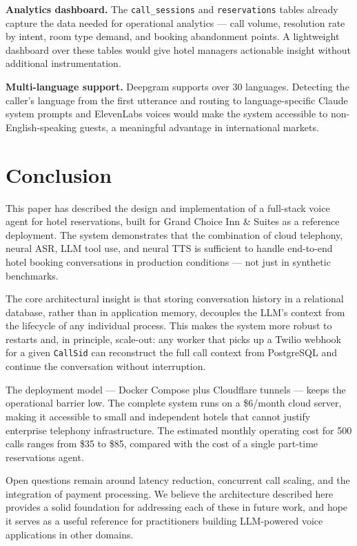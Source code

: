 \documentclass[conference]{IEEEtran}
\begin{document}
\textbf{Analytics dashboard.} The \texttt{call\_sessions} and
\texttt{reservations} tables already capture the data needed for operational
analytics — call volume, resolution rate by intent, room type demand, and
booking abandonment points. A lightweight dashboard over these tables would
give hotel managers actionable insight without additional instrumentation.

\textbf{Multi-language support.} Deepgram supports over 30 languages.
Detecting the caller's language from the first utterance and routing to
language-specific Claude system prompts and ElevenLabs voices would make the
system accessible to non-English-speaking guests, a meaningful advantage in
international markets.


\section{Conclusion}
\label{sec:conclusion}

This paper has described the design and implementation of a full-stack voice
agent for hotel reservations, built for Grand Choice Inn \& Suites as a
reference deployment. The system demonstrates that the combination of cloud
telephony, neural ASR, LLM tool use, and neural TTS is sufficient to handle
end-to-end hotel booking conversations in production conditions — not just in
synthetic benchmarks.

The core architectural insight is that storing conversation history in a
relational database, rather than in application memory, decouples the LLM's
context from the lifecycle of any individual process. This makes the system
more robust to restarts and, in principle, scale-out: any worker that picks
up a Twilio webhook for a given \texttt{CallSid} can reconstruct the full
call context from PostgreSQL and continue the conversation without interruption.

The deployment model — Docker Compose plus Cloudflare tunnels — keeps the
operational barrier low. The complete system runs on a \$6/month cloud server,
making it accessible to small and independent hotels that cannot justify
enterprise telephony infrastructure. The estimated monthly operating cost for
500 calls ranges from \$35 to \$85, compared with the cost of a single
part-time reservations agent.

Open questions remain around latency reduction, concurrent call scaling, and
the integration of payment processing. We believe the architecture described
here provides a solid foundation for addressing each of these in future work,
and hope it serves as a useful reference for practitioners building
LLM-powered voice applications in other domains.
\end{document}
